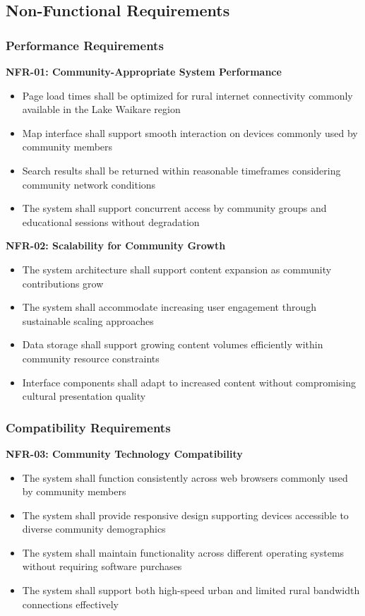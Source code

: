 \subsection{Non-Functional Requirements}
\label{subsec:nonfunctional_requirements}

\subsubsection{Performance Requirements}
\label{subsubsec:performance_requirements}

\textbf{NFR-01: Community-Appropriate System Performance}
\begin{itemize}
    \item Page load times shall be optimized for rural internet connectivity commonly available in the Lake Waikare region
    \item Map interface shall support smooth interaction on devices commonly used by community members
    \item Search results shall be returned within reasonable timeframes considering community network conditions
    \item The system shall support concurrent access by community groups and educational sessions without degradation
\end{itemize}

\textbf{NFR-02: Scalability for Community Growth}
\begin{itemize}
    \item The system architecture shall support content expansion as community contributions grow
    \item The system shall accommodate increasing user engagement through sustainable scaling approaches
    \item Data storage shall support growing content volumes efficiently within community resource constraints
    \item Interface components shall adapt to increased content without compromising cultural presentation quality
\end{itemize}

\subsubsection{Compatibility Requirements}
\label{subsubsec:compatibility_requirements}

\textbf{NFR-03: Community Technology Compatibility}
\begin{itemize}
    \item The system shall function consistently across web browsers commonly used by community members
    \item The system shall provide responsive design supporting devices accessible to diverse community demographics
    \item The system shall maintain functionality across different operating systems without requiring software purchases
    \item The system shall support both high-speed urban and limited rural bandwidth connections effectively
\end{itemize}

